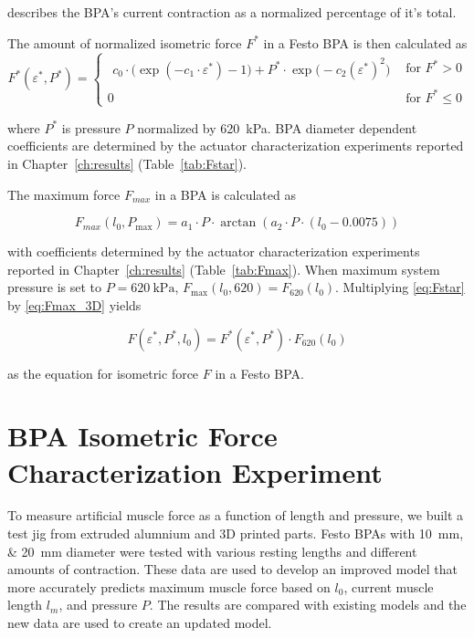 describes the BPA's current contraction as a normalized percentage of it's total.

The amount of normalized isometric force $F^*$ in a Festo BPA is then calculated as
\begin{equation}
F^*(\varepsilon^*,P^*)=
\begin{cases}
\begin{aligned}
c_0\cdot\bigl(\exp(-c_1 \cdot \varepsilon^*)-1\bigr)
+ P^*\cdot\exp\!\bigl(-c_2(\varepsilon^*)^{2}\bigr)
\end{aligned}
& \text{for } F^*>0\\[10pt]
0
& \text{for } F^*\le 0
\end{cases}\label{eq:Fstar}
\end{equation}

where $P^*$ is pressure $P$ normalized by \qty{620}{\kPa}. BPA diameter dependent coefficients are determined by the actuator characterization experiments reported in Chapter~\ref{ch:results} (Table~\ref{tab:Fstar}).

The maximum force $F_{max}$ in a BPA is calculated as

\begin{equation}
    F_{max}(l_{0},P_\text{max}) = a_1 \cdot P \cdot \arctan{(a_2 \cdot P \cdot (l_{0}-0.0075))} \label{eq:Fmax_3D}
\end{equation}

with coefficients determined by the actuator characterization experiments reported in Chapter~\ref{ch:results} (Table~\ref{tab:Fmax}). When maximum system pressure is set to $P=\qty{620}{\kPa}$, $F_\text{max}(l_{0},620) = F_{620}(l_{0})$. Multiplying \eqref{eq:Fstar} by \eqref{eq:Fmax_3D} yields

 \begin{equation}
   F(\varepsilon^*,P^*,l_{0}) = F^*(\varepsilon^*,P^*) \cdot F_{620}(l_{0}) \label{eq:force}
\end{equation}

as the equation for isometric force $F$ in a Festo BPA.

\section{BPA Isometric Force Characterization Experiment}\label{sec:force_experiment}


To measure artificial muscle force as a function of length and pressure, we built a test jig from extruded alumnium and 3D printed parts. Festo BPAs with \qtylist{10;20}{\mm} diameter were tested with various resting lengths and different amounts of contraction. These data are used to develop an improved model that more accurately predicts maximum muscle force based on $l_0$, current muscle length $l_{m}$, and pressure $P$. The results are compared with existing models and the new data are used to create an updated model. 


